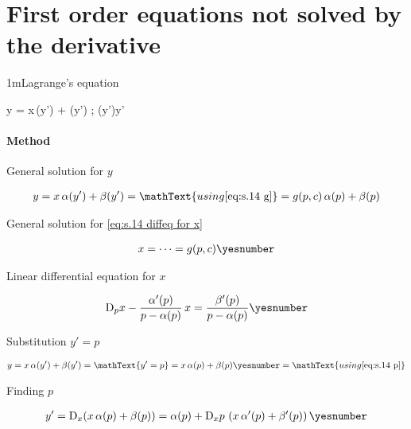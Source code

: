 \documentclass["AM3C-Slides_annotations.tex"]{subfiles}
\begin{document}
\part*{First order equations not solved by the derivative}

\begin{sectionBox}1m{Lagrange's equation} %
  \label{sec:lagranges equation}
  \begin{BM}
    y = x\,\alpha(y') + \beta(y')
    ; \alpha(y')\neq y'
  \end{BM}

  \subsection*{Method}

  General solution for \(y\)
  \begin{tcolorbox}
    \begin{gather*}
      y = x\,\alpha(y') + \beta(y')
      = \mathText{using 
        \eqref{eq:s.14 g}
      }
      = g(p,c)\,\alpha(p)+\beta(p)
    \end{gather*}
  \end{tcolorbox}

  General solution for \eqref{eq:s.14 diffeq for x}
  \begin{tcolorbox}
    \begin{gather*}
      x 
      = \dots
      = g(p,c)
      \yesnumber\label{eq:s.14 g}
    \end{gather*}
  \end{tcolorbox}

  Linear differential equation for \(x\)
  \begin{tcolorbox}
    \begin{gather*}
      \mdif{p}{x}
      - \frac{\alpha'(p)}{p-\alpha(p)}
      \,x
      = \frac{\beta'(p)}{p-\alpha(p)}
      \yesnumber\label{eq:s.14 diffeq for x}
    \end{gather*}
  \end{tcolorbox}

  Substitution \(y'=p\)
  \begin{tcolorbox}
    \begin{gather*}
      y 
      = x\,\alpha(y')+\beta(y')
      = \mathText{y'=p}
      = x\,\alpha(p)+\beta(p)
      \yesnumber\label{eq:s.14 y' to p}
      = \mathText{using \eqref{eq:s.14 p}}
    \end{gather*}
  \end{tcolorbox}

  Finding \(p\)
  \begin{tcolorbox}
    \begin{gather*}
      y'
      = \mdif{x}{(
          x\,\alpha(p)
          + \beta(p)
      )}
      = \alpha(p)
      + \mdif{x}{p}
      \,\left(
        x\,\alpha'(p)
        + \beta'(p)
      \right)
      \yesnumber\label{eq:s.14 p}
    \end{gather*}
  \end{tcolorbox}
\end{sectionBox}
\end{document}
